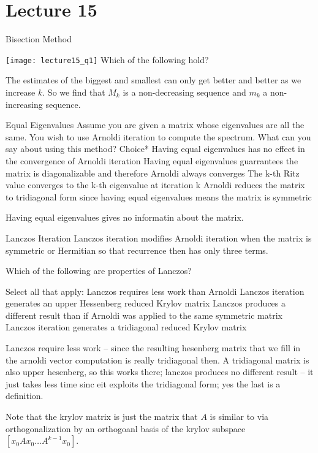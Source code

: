 \documentclass[../main.tex]{subfiles}
\begin{document}
    \section{Lecture 15}{Bisection Method}

    \texttt{[image: lecture15\_q1]}
    Which of the following hold?
    \begin{solution}
        The estimates of the biggest and smallest can only get better and better as we increase $k$. So we find that $M_k$ is a non-decreasing sequence and $m_k$ a non-increasing sequence.
    \end{solution}

    Equal Eigenvalues
Assume you are given a matrix whose eigenvalues are all the same. You wish to use Arnoldi iteration to compute the spectrum. What can you say about using this method?
Choice*
Having equal eigenvalues has no effect in the convergence of Arnoldi iteration
Having equal eigenvalues guarrantees the matrix is diagonalizable and therefore Arnoldi always converges
The k-th Ritz value converges to the k-th eigenvalue at iteration k
Arnoldi reduces the matrix to tridiagonal form since having equal eigenvalues means the matrix is symmetric
\begin{solution}
    Having equal eigenvalues gives no informatin about the matrix.
\end{solution}

Lanczos Iteration
Lanczos iteration modifies Arnoldi iteration when the matrix is symmetric or Hermitian so that recurrence then has only three terms.

Which of the following are properties of Lanczos?

Select all that apply:
Lanczos requires less work than Arnoldi
Lanczos iteration generates an upper Hessenberg reduced Krylov matrix
Lanczos produces a different result than if Arnoldi was applied to the same symmetric matrix
Lanczos iteration generates a tridiagonal reduced Krylov matrix
\begin{solution}
    Lanczos require less work -- since the resulting hesenberg matrix that we fill in the arnoldi vector computation is really tridiagonal then. A tridiagonal matrix is also upper hesenberg, so this works there; lanczos produces no different result -- it just takes less time sinc eit exploits the tridiagonal form; yes the last is a definition.

    Note that the krylov matrix is just the matrix that $A$ is similar to via orthogonalization by an orthogoanl basis of the krylov subspace $[x_0 Ax_0 \dots A^{k-1}x_0]$.
\end{solution}
\end{document}
